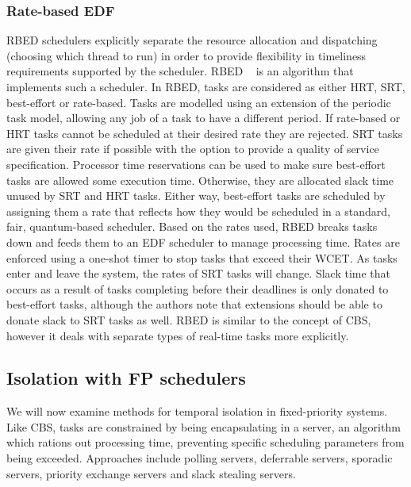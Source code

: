 \subsubsection{Rate-based EDF}

\Gls{RBED} schedulers explicitly separate the resource allocation and dispatching
(choosing which thread to run) in order to provide flexibility in timeliness requirements supported
by the scheduler.  \Gls{RBED} ~\citep{Brandt_BLB_03} is an algorithm that implements such a
scheduler.  In \gls{RBED}, tasks are considered as either \gls{HRT}, \gls{SRT}, best-effort or
rate-based.  Tasks are modelled using an extension of the periodic task model, allowing any job of a
task to have a different period.  If rate-based or \gls{HRT} tasks cannot be scheduled at their
desired rate they are rejected.  \gls{SRT} tasks are given their rate if possible with the option to
provide a quality of service specification.  Processor time reservations can be used to make sure
best-effort tasks are allowed some execution time.  Otherwise, they are allocated slack time unused
by SRT and HRT tasks.  Either way, best-effort tasks are scheduled by assigning them a rate that
reflects how they would be scheduled in a standard, fair, quantum-based scheduler.  Based on the
rates used, \gls{RBED} breaks tasks down and feeds them to an \gls{EDF} scheduler to manage
processing time.  Rates are enforced using a one-shot timer to stop tasks that exceed their
{\gls{WCET}}.  As tasks enter and leave the system, the rates of \gls{SRT} tasks will change.  Slack
time that occurs as a result of tasks completing before their deadlines is only donated to 
best-effort tasks, although the authors note that extensions should be able to donate slack to \gls{SRT}
tasks as well.  \Gls{RBED} is similar to the concept of \gls{CBS}, however it deals with separate types of
real-time tasks more explicitly.

\subsection{Isolation with FP schedulers}
\label{background:fp-isolation}

We will now
examine methods for temporal isolation in fixed-priority systems. 
Like \gls{CBS}, tasks are constrained by being encapsulating in a server, an algorithm which
rations out processing time, preventing specific scheduling parameters from being exceeded.
Approaches include polling servers, deferrable servers, sporadic servers, priority exchange servers
and slack stealing servers. 


